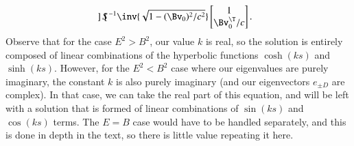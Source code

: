 {\begin{equation}
\begin{aligned}
\begin{bmatrix}
\end{bmatrix} S^{-1} \inv{\sqrt{1 - (\Bv_0)^2/c^2}}
\begin{bmatrix}
1 \\
\Bv_0^\T/c
\end{bmatrix}.
\end{aligned}
\end{equation}
%
Observe that for the case \(E^2 > B^2\), our value \(k\) is real, so the solution is entirely composed of linear combinations of the hyperbolic functions \(\cosh(k s)\) and \(\sinh(ks)\).  However, for the \(E^2 < B^2\) case where our eigenvalues are purely imaginary, the constant \(k\) is also purely imaginary (and our eigenvectors \(e_{\pm D}\) are complex).  In that case, we can take the real part of this equation, and will be left with a solution that is formed of linear combinations of \(\sin(ks)\) and \(\cos(ks)\) terms.  The \(E = B\) case would have to be handled separately, and this is done in depth in the text, so there is little value repeating it here.

}

